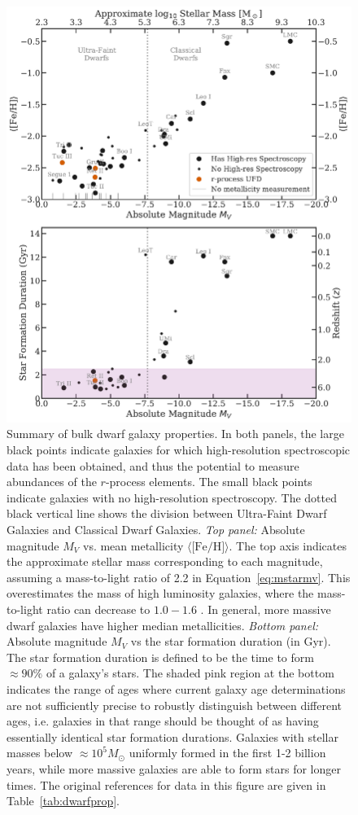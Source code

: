 \documentclass[letterpaper]{article}
\begin{document}
\begin{figure}
\centering
    \includegraphics[width=0.7\linewidth]{figures/dwarf_properties.pdf}
    \caption{
    Summary of bulk dwarf galaxy properties.
    In both panels, the large black points indicate galaxies for which high-resolution spectroscopic data has been obtained, and thus the potential to measure abundances of the $r$-process elements. The small black points indicate galaxies with no high-resolution spectroscopy. The dotted black vertical line shows the division between Ultra-Faint Dwarf Galaxies and Classical Dwarf Galaxies.
    \emph{Top panel:} Absolute magnitude $M_V$ vs. mean metallicity $\langle\mbox{[Fe/H]}\rangle$. The top axis indicates the approximate stellar mass corresponding to each magnitude, assuming a mass-to-light ratio of 2.2 in Equation~\ref{eq:mstarmv}. This overestimates the mass of high luminosity galaxies, where the mass-to-light ratio can decrease to $1.0-1.6$ \citep{Kirby2013}.
    In general, more massive dwarf galaxies have higher median metallicities.
    \emph{Bottom panel:} Absolute magnitude $M_V$ vs the star formation duration (in Gyr).
    The star formation duration is defined to be the time to form ${\approx}90\%$ of a galaxy's stars.
    The shaded pink region at the bottom indicates the range of ages where current galaxy age determinations are not sufficiently precise to robustly distinguish between different ages, i.e. galaxies in that range should be thought of as having essentially identical star formation durations.
    Galaxies with stellar masses below ${\approx}10^5 M_\odot$ uniformly formed in the first 1-2 billion years, while more massive galaxies are able to form stars for longer times.
    The original references for data in this figure are given in Table~\ref{tab:dwarfprop}.
    }
    \label{fig:dwarfprop}
\end{figure}
\end{document}
